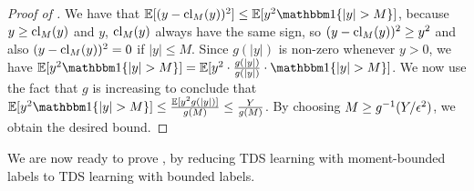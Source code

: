 \begin{proof}[Proof of ]
    We have that $\E[(y-\clip_M(y))^2] \le \E[y^2 \ind\{|y|> M\}]$, because $y\ge\mathrm{cl}_M(y)$ and $y$, $\mathrm{cl}_M(y)$ always have the same sign, so $(y-\mathrm{cl}_M(y))^2 \ge y^2$ and also $(y-\mathrm{cl}_M(y))^2 = 0$ if $|y|\le M$. Since $g(|y|)$ is non-zero whenever $y>0$, we have $\E[y^2 \ind\{|y|> M\}] = \E[y^2 \cdot \frac{g(|y|)}{g(|y|)} \cdot \ind\{|y|> M\}]$. We now use the fact that $g$ is increasing to conclude that $\E[y^2 \ind\{|y|> M\}] \le \frac{\E[y^2g(|y|)]}{g(M)} \le \frac{Y}{g(M)}$. By choosing $M \ge g^{-1}(Y/{\epsilon}^2)$, we obtain the desired bound.
\end{proof}

We are now ready to prove , by reducing TDS learning with moment-bounded labels to TDS learning with bounded labels.

